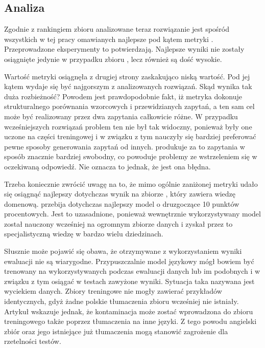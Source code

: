 \subsection{Analiza}
Zgodnie z rankingiem zbioru  analizowane teraz rozwiązanie jest spośród wszystkich w tej pracy omawianych najlepsze pod kątem metryki . Przeprowadzone eksperymenty to potwierdzają. Najlepsze wyniki nie zostały osiągnięte jedynie w przypadku zbioru , lecz również są dość wysokie.

Wartość metryki  osiągnęła z drugiej strony zaskakująco niską wartość. Pod jej kątem  wydaje się być najgorszym z analizowanych rozwiązań. Skąd wynika tak duża rozbieżność? Powodem jest prawdopodobnie fakt, iż metryka  dokonuje strukturalnego porównania wzorcowych i przewidzianych  zapytań, a ten sam cel może być realizowany przez dwa zapytania całkowicie różne. W przypadku wcześniejszych rozwiązań problem ten nie był tak widoczny, ponieważ były one uczone na części treningowej i w związku z tym nauczyły się bardziej preferować pewne sposoby generowania zapytań od innych.  produkuje za to zapytania w sposób znacznie bardziej swobodny, co powoduje problemy ze wstrzeleniem się w oczekiwaną odpowiedź. Nie oznacza to jednak, że jest ona błędna. 

Trzeba koniecznie zwrócić uwagę na to, że mimo ogólnie zaniżonej metryki  udało się osiągnąć najlepszy dotychczas wynik na zbiorze , który zawiera wiedzę domenową.  przebija dotychczas najlepszy model  o druzgoczące 10 punktów procentowych. Jest to uzasadnione, ponieważ wewnętrznie wykorzystywany model  został nauczony wcześniej na ogromnym zbiorze danych i zyskał przez to specjalistyczną wiedzę w bardzo wielu dziedzinach.

Słusznie może pojawić się obawa, że otrzymywane z wykorzystaniem  wyniki ewaluacji nie są wiarygodne. Przypuszczalnie model językowy  mógł bowiem być trenowany na wykorzystywanych podczas ewaluacji danych lub im podobnych i w związku z tym osiągać w testach zawyżone wyniki. Sytuacja taka nazywana jest wyciekiem danych. Zbiory treningowe nie mogły zawierać przykładów identycznych, gdyż żadne polskie tłumaczenia zbioru  wcześniej nie istniały. Artykuł   wskazuje jednak, że kontaminacja może zostać wprowadzona do zbioru treningowego także poprzez tłumaczenia na inne języki. Z tego powodu angielski zbiór  oraz jego istniejące już tłumaczenia mogą stanowić zagrożenie dla rzetelności testów.

